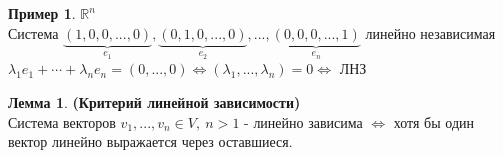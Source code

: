 \documentclass[a4paper, 12pt]{article}
\newcommand{\R}{\mathbb R}
\newcounter{lemcount}
\newcounter{lemcount2}
\theoremstyle{definition}
\newtheorem*{example1}{Пример}
\newtheorem{lemmanum}[lemcount]{Лемма}
\begin{document}
  \begin{example1}
    $\R^n$ \\
    Система $\underbrace{(1,0,0,...,0)}_{e_1} , \underbrace{(0,1,0,...,0)}_{e_2},...,\underbrace{(0,0,0,...,1)}_{e_n}$ линейно независимая \\
    $\lambda_1 e_1 + \cdots + \lambda_n e_n = (0,...,0) \Longleftrightarrow (\lambda_1,...,\lambda_n) = 0 \Longleftrightarrow $ ЛНЗ 
  \end{example1}
  \begin{lemmanum}\textbf{(Критерий линейной зависимости)}\\
    Система векторов $v_1,...,v_n \in V, \ n>1$ - линейно зависима $\Longleftrightarrow $ хотя бы один вектор линейно выражается через оставшиеся.  
  \end{lemmanum} 
\end{document}
